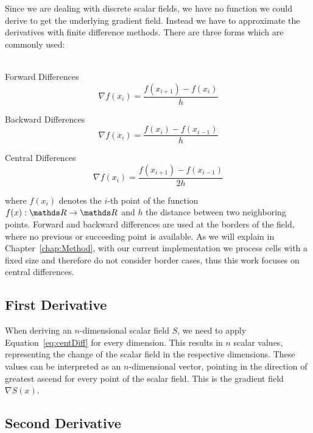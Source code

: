 Since we are dealing with discrete scalar fields, we have no function we
could derive to get the underlying gradient field. Instead we have to
approximate the derivatives with finite difference methods. There are
three forms which are commonly used:\\
\\
\begin{inparaenum}[(a)]
  \item Forward Differences
  \begin{equation}
    \nabla f(x_i) = \frac{f(x_{i+1}) - f(x_i)}{h}
  \end{equation}
  \item Backward Differences
  \begin{equation}
    \nabla f(x_i) = \frac{f(x_i) - f(x_{i-1})}{h}
  \end{equation}
  \item Central Differences
  \begin{equation}\label{eq:centDiff}
    \nabla f(x_i) = \frac{f(x_{i+1}) - f(x_{i-1})}{2h}
  \end{equation}
\end{inparaenum}
where $f(x_i)$ denotes the $i$-th point of the function $f(x): \real
\rightarrow \real$ and $h$ the distance between two neighboring points.
Forward and backward differences are used at the borders of the field,
where no previous or succeeding point is available. As we will explain
in Chapter~\ref{chap:Method}, with our current implementation we process
cells with a fixed size and therefore do not consider border cases, thus
this work focuses on central differences.

\subsection{First Derivative}

When deriving an $n$-dimensional scalar field $S$, we need to apply
Equation~\ref{eq:centDiff} for every dimension. This results in $n$
scalar values, representing the change of the scalar field in the
respective dimensions. These values can be interpreted as an
$n$-dimensional vector, pointing in the direction of greatest ascend for
every point of the scalar field. This is the gradient field $\nabla
S(x)$.

\subsection{Second Derivative}

